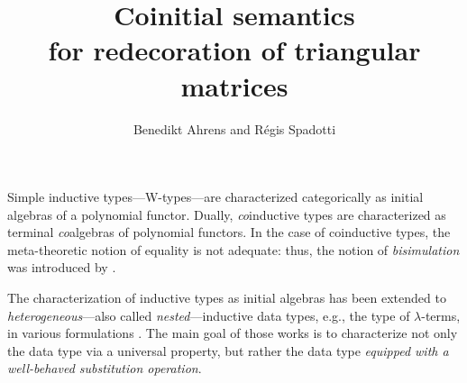 \documentclass{easychair}
\begin{document}
\title{Coinitial semantics \\ for redecoration of triangular matrices}

\author{Benedikt Ahrens and R\'egis Spadotti}



%   
%   

\maketitle




 Simple inductive types---\textsf{W}-types---are characterized categorically as initial algebras of
 a polynomial functor.
 Dually, \emph{co}inductive types are characterized as terminal \emph{co}algebras of polynomial functors.
 In the case of coinductive types, the meta-theoretic notion of equality is not adequate: thus, the notion of 
 \emph{bisimulation} was introduced by \textcite{aczel_nonwellfounded}.

 
 The characterization of inductive types as initial algebras 
 has been extended to \emph{heterogeneous}---also called \emph{nested}---inductive data types, e.g., the type of $\lambda$-terms,
 in various formulations \parencite{fpt, DBLP:journals/iandc/HirschowitzM10}.
 The main goal of those works is to characterize not only the data type via a universal property, but rather the data type
 \emph{equipped with a well-behaved substitution operation}.
 
\end{document}
